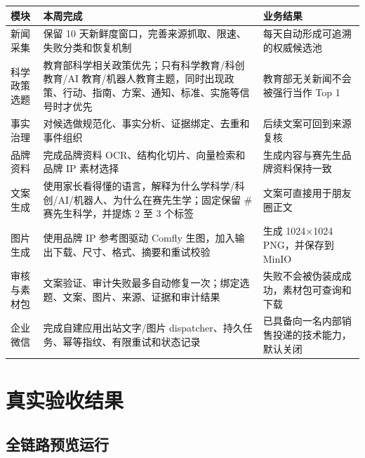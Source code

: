 \documentclass[UTF8,11pt,a4paper,fontset=none]{ctexart}
\begin{document}
\noindent\begin{tabularx}{\textwidth}{L{3.0cm}L{5.3cm}Y}
\toprule
{}
\color{white}\bfseries\sffamily 模块 &
\color{white}\bfseries\sffamily 本周完成 &
\color{white}\bfseries\sffamily 业务结果 \\
\midrule
新闻采集 & 保留 10 天新鲜度窗口，完善来源抓取、限速、失败分类和恢复机制 & 每天自动形成可追溯的权威候选池 \\
科学政策选题 & 教育部科学相关政策优先；只有科学教育/科创教育/AI 教育/机器人教育主题，同时出现政策、行动、指南、方案、通知、标准、实施等信号时才优先 & 教育部无关新闻不会被强行当作 Top 1 \\
事实治理 & 对候选做规范化、事实分析、证据绑定、去重和事件组织 & 后续文案可回到来源复核 \\
品牌资料 & 完成品牌资料 OCR、结构化切片、向量检索和品牌 IP 素材选择 & 生成内容与赛先生品牌资料保持一致 \\
文案生成 & 使用家长看得懂的语言，解释为什么学科学/科创/AI/机器人、为什么在赛先生学；固定保留 \#赛先生科学，并提炼 2 至 3 个标签 & 文案可直接用于朋友圈正文 \\
图片生成 & 使用品牌 IP 参考图驱动 Comfly 生图，加入输出下载、尺寸、格式、摘要和重试校验 & 生成 1024×1024 PNG，并保存到 MinIO \\
审核与素材包 & 文案验证、审计失败最多自动修复一次；绑定选题、文案、图片、来源、证据和审计结果 & 失败不会被伪装成成功，素材包可查询和下载 \\
企业微信 & 完成自建应用出站文字/图片 dispatcher、持久任务、幂等指纹、有限重试和状态记录 & 已具备向一名内部销售投递的技术能力，默认关闭 \\
\bottomrule
\end{tabularx}

\section{真实验收结果}

\subsection{全链路预览运行}
\end{document}
